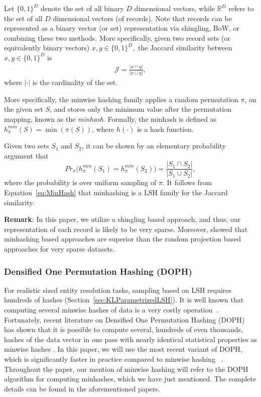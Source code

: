\documentclass[aoas]{imsart}
\begin{document}
Let $\{0,1\}^D$ denote the set of all binary $D$ dimensional vectors, while $\mathbb{R}^D$ refers to the set of all $D$ dimensional vectors (of records). Note that records can be represented as a binary vector (or set) representation via shingling, BoW, or combining these two methods. More specifically, given two record sets (or equivalently binary vectors) $x,y \in \{0,1\}^D,$ the Jaccard similarity between $x, y \in \{0,1\}^D$  is\begin{align*}
\mathcal{J} = \frac{|x \cap y|}{|x \cup y|},
\end{align*}
where $|\cdot|$ is the cardinality of the set.

More specifically, the minwise hashing family applies a random permutation $\pi$, on the given set $S$, and stores only the minimum value after the permutation mapping, known as the \emph{minhash}.  Formally, the minhash is defined as $h_{\pi}^{min}(S) = \min(\pi(S))$, where $h(\cdot)$ is a hash function.

Given two sets $S_1$ and $S_2$, it can be shown by an elementary probability argument that
\begin{equation}
\label{eq:MinHash}
Pr_{\pi}({h_{\pi}^{min}(S_1) = h_{\pi}^{min}(S_2)) =  \frac{|S_1 \cap S_2|}{| S_1 \cup S_2|}},
\end{equation}
where the probability is over uniform sampling of $\pi$. It follows from Equation~\ref{eq:MinHash} that minhashing is a LSH family for the Jaccard similarity.

\textbf{Remark}: In this paper, we utilize a shingling based approach, and thus, our representation of each record is likely to be very sparse. Moreover, \cite{shrivastava2014defense} showed that minhashing based approaches are superior than the random projection based approaches for very sparse datasets.


\subsubsection{Densified One Permutation Hashing (DOPH)}
For realistic sized entity resolution tasks, sampling based on LSH requires hundreds of hashes (Section~\ref{sec:KLParametrizedLSH}). It is well known that computing several minwise hashes of data is a very costly operation~\citep{li2012gpu}. Fortunately, recent literature on Densified One Permutation Hashing (DOPH) has shown that it is possible to compute several, hundreds of even thousands, hashes of the data vector in one pass with nearly identical statistical properties as minwise hashes \citep{shrivastava2014densifying,shrivastava2014improved,shrivastava2017optimal}. In this paper, we will use the most recent variant of DOPH, which is significantly faster in practice compared to minwise hashing ~\citep{shrivastava2017optimal}. Throughout the paper, our mention of minwise hashing will refer to the DOPH algorithm for computing minhashes, which we have just mentioned. The complete details can be found in the aforementioned papers.
\end{document}
